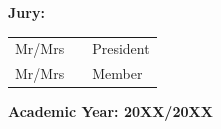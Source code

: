 \begin{titlepage}
\begin{center}
    \small\textbf{Jury:}\\[0.2cm]
    \begin{tabular}{lll}
        Mr/Mrs & \hspace{4cm} & President \\[0.2cm]
        Mr/Mrs & \hspace{4cm} & Member \\
    \end{tabular}
\end{center}

\vfill
\textbf{Academic Year: 20XX/20XX}

\end{titlepage}
\restoregeometry